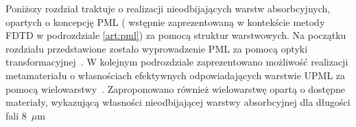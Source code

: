Poniższy rozdział traktuje o realizacji nieodbijających warstw absorbcyjnych, opartych o koncepcję PML ( wstępnie zaprezentowaną w kontekście metody FDTD w podrozdziale \ref{art:pml}) za pomocą struktur warstwowych. Na początku rozdziału przedstawione zostało wyprowadzenie PML za pomocą optyki transformacyjnej~\cite{pendry2012transformation}. W kolejnym podrozdziale zaprezentowano możliwość realizacji metamateriału o własnościach efektywnych odpowiadających warstwie UPML za pomocą wielowarstwy~\cite{ania2015}. Zaproponowano również wielowarstwę opartą o dostępne materiały, wykazującą własności nieodbijającej warstwy absorbcyjnej dla długości fali $8$~$\mu$m


